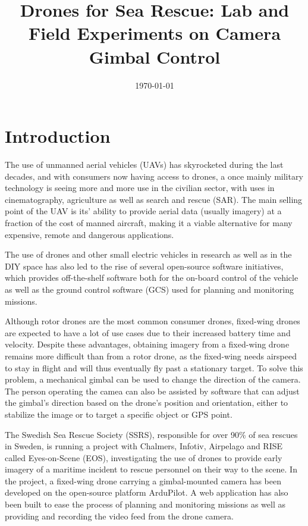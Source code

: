 \documentclass[nofilelist]{cslthse-msc}
\title{Drones for Sea Rescue: Lab and Field Experiments on Camera Gimbal Control}
\date{\today}
\begin{document}
\renewcommand{\bibname}{References}

\makefrontmatter


\chapter{Introduction}
The use of unmanned aerial vehicles (UAVs) has skyrocketed during the last decades, and with consumers now having access to drones, a once mainly military technology is seeing more and more use in the civilian sector, with uses in cinematography, agriculture as well as search and rescue (SAR). The main selling point of the UAV is its' ability to provide aerial data (usually imagery) at a fraction of the cost of manned aircraft, making it a viable alternative for many expensive, remote and dangerous applications.

The use of drones and other small electric vehicles in research as well as in the DIY space has also led to the rise of several open-source software initiatives, which provides off-the-shelf software both for the on-board control of the vehicle as well as the ground control software (GCS) used for planning and monitoring missions. 

Although rotor drones are the most common consumer drones, fixed-wing drones are expected to have a lot of use cases due to their increased battery time and velocity. Despite these advantages, obtaining imagery from a fixed-wing drone remains more difficult than from a rotor drone, as the fixed-wing needs airspeed to stay in flight and will thus eventually fly past a stationary target. To solve this problem, a mechanical gimbal can be used to change the direction of the camera. The person operating the camea can also be assisted by software that can adjust the gimbal's direction based on the drone's position and orientation, either to stabilize the image or to target a specific object or GPS point.

The Swedish Sea Rescue Society (SSRS), responsible for over 90\% of sea rescues in Sweden, is running a project with Chalmers, Infotiv, Airpelago and RISE called Eyes-on-Scene (EOS), investigating the use of drones to provide early imagery of a maritime incident to rescue personnel on their way to the scene. In the project, a fixed-wing drone carrying a gimbal-mounted camera has been developed on the open-source platform ArduPilot. A web application has also been built to ease the process of planning and monitoring missions as well as providing and recording the video feed from the drone camera.
\end{document}

